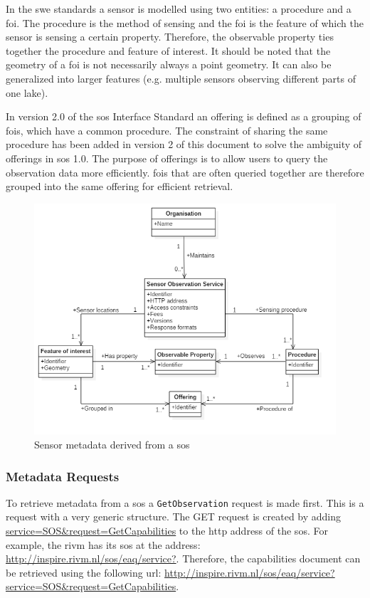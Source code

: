 In the \ac{swe} standards a sensor is modelled using two entities: a procedure and a \acf{foi}. The procedure is the method of sensing and the \ac{foi} is the feature of which the sensor is sensing a certain property. Therefore, the observable property ties together the procedure and feature of interest. It should be noted that the geometry of a \ac{foi} is not necessarily always a point geometry. It can also be generalized into larger features (e.g. multiple sensors observing different parts of one lake). 

In version 2.0 of the \acl{sos} Interface Standard \citep{SW:OGC2} an offering is defined as a grouping of \acp{foi}, which have a common procedure. The constraint of sharing the same procedure has been added in version 2 of this document to solve the ambiguity of offerings in \ac{sos} 1.0. The purpose of offerings is to allow users to query the observation data more efficiently. \acp{foi} that are often queried together are therefore grouped into the same offering for efficient retrieval.        

\begin{figure}
	\centering
	\includegraphics[width=\linewidth]{UML/SOS_UML.PNG}
	\caption{Sensor metadata derived from a \ac{sos}}
	\label{fig:SOS_UML}
\end{figure}

\subsubsection{Metadata Requests}
\label{par:metadataRequests}
To retrieve metadata from a \ac{sos} a \texttt{GetObservation} request is made first. This is a request with a very generic structure. The GET request is created by adding \url{service=SOS\&request=GetCapabilities} to the \ac{http} address of the \ac{sos}. For example, the \ac{rivm} has its \ac{sos} at the address: \url{http://inspire.rivm.nl/sos/eaq/service?}. Therefore, the capabilities document can be retrieved using the following \ac{url}: \url{http://inspire.rivm.nl/sos/eaq/service?service=SOS&request=GetCapabilities}. 

